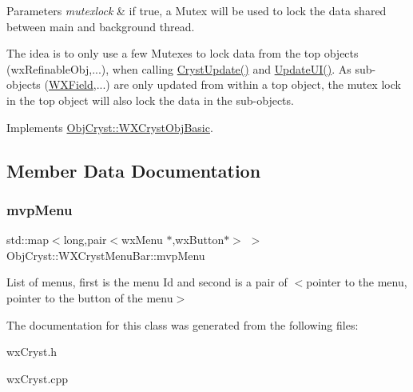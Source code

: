 \begin{DoxyParams}{Parameters}
{\em mutexlock} & if true, a Mutex will be used to lock the data shared between main and background thread.\\
\hline
\end{DoxyParams}
The idea is to only use a few Mutexes to lock data from the top objects (wx\+Refinable\+Obj,...), when calling \mbox{\hyperlink{class_obj_cryst_1_1_w_x_cryst_menu_bar_a9cdd403a3463200227c2cdda64ad0317}{Cryst\+Update()}} and \mbox{\hyperlink{class_obj_cryst_1_1_w_x_cryst_menu_bar_a87182041080b9726b38292547632413f}{Update\+U\+I()}}. As sub-\/objects (\mbox{\hyperlink{class_obj_cryst_1_1_w_x_field}{W\+X\+Field}},...) are only updated from within a top object, the mutex lock in the top object will also lock the data in the sub-\/objects. 

Implements \mbox{\hyperlink{class_obj_cryst_1_1_w_x_cryst_obj_basic_a3818940b7031ff7e45cf2178c4a99c90}{Obj\+Cryst\+::\+W\+X\+Cryst\+Obj\+Basic}}.



\subsection{Member Data Documentation}
\mbox{\label{class_obj_cryst_1_1_w_x_cryst_menu_bar_a73b92cea8b7a55c69d3c552771505560}} 
\subsubsection{\texorpdfstring{mvpMenu}{mvpMenu}}
{\footnotesize\ttfamily std\+::map$<$long,pair$<$wx\+Menu $\ast$,wx\+Button$\ast$$>$ $>$ Obj\+Cryst\+::\+W\+X\+Cryst\+Menu\+Bar\+::mvp\+Menu\hspace{0.3cm}{\ttfamily [protected]}}

List of menus, first is the menu Id and second is a pair of $<$pointer to the menu, pointer to the button of the menu$>$ 

The documentation for this class was generated from the following files\+:\begin{DoxyCompactItemize}
\item 
wx\+Cryst.\+h\item 
wx\+Cryst.\+cpp\end{DoxyCompactItemize}

